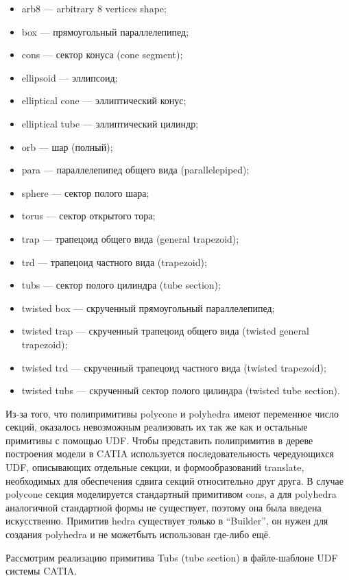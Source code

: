 \begin{itemize}
\itemsep0pt
\item arb8 --- arbitrary 8 vertices shape;
\item box --- прямоугольный параллелепипед;
\item cons --- сектор конуса (cone segment);
\item ellipsoid --- эллипсоид;
\item elliptical cone --- эллиптический конус;
\item elliptical tube --- эллиптический цилиндр;
\item orb --- шар (полный);
\item para --- параллелепипед общего вида (parallelepiped);
\item sphere --- сектор полого шара;
\item torus --- сектор открытого тора;
\item trap --- трапецоид общего вида (general trapezoid);
\item trd --- трапецоид частного вида (trapezoid);
\item tubs --- сектор полого цилиндра (tube section);
\item twisted box --- скрученный прямоугольный параллелепипед;
\item twisted trap --- скрученный трапецоид общего вида (twisted general trapezoid);
\item twisted trd --- скрученный трапецоид частного вида (twisted trapezoid);
\item twisted tubs --- скрученный сектор полого цилиндра (twisted tube section).
\end{itemize}

Из-за того, что полипримитивы polycone и polyhedra имеют переменное число секций, оказалось невозможным реализовать их так же как и остальные примитивы с помощью UDF. Чтобы представить полипримитив в дереве построения модели в CATIA используется последовательность чередующихся UDF, описывающих отдельные секции, и формообразований translate, необходимых для обеспечения сдвига секций относительно друг друга. В случае polycone секция моделируется стандартный примитивом cons, а для polyhedra аналогичной стандартной формы не существует, поэтому она была введена искусственно. Примитив hedra существует только в ``Builder'', он нужен для создания polyhedra и не можетбыть использован где-либо ещё.

Рассмотрим реализацию примитива Tubs (tube section) в файле-шаблоне UDF системы CATIA.

